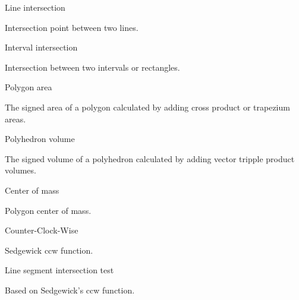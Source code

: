 \begin{algorithm}{Line intersection}

Intersection point between two lines.
\end{algorithm}

\begin{algorithm}{Interval intersection}

Intersection between two intervals or rectangles.
\end{algorithm}

\begin{algorithm}{Polygon area}

The signed area of a polygon calculated by adding cross product or
trapezium areas.
\end{algorithm}

\begin{algorithm}{Polyhedron volume}

The signed volume of a polyhedron calculated by adding vector tripple
product volumes.
\end{algorithm}

\begin{algorithm}{Center of mass}

Polygon center of mass.
\end{algorithm}

\begin{algorithm}{Counter-Clock-Wise}

Sedgewick ccw function.
\end{algorithm}

\begin{algorithm}{Line segment intersection test}

Based on Sedgewick's ccw function.
\end{algorithm}
